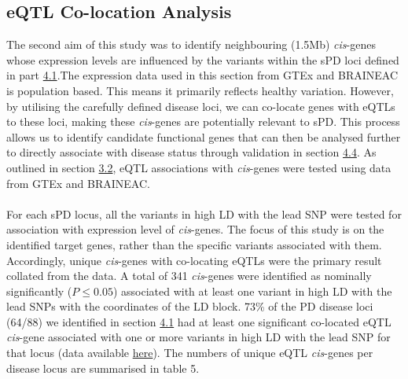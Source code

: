 \documentclass{article}
\begin{document}
\subsection{eQTL Co-location Analysis}
\label{subsec:eQTLcoloc}
The second aim of this study was to identify neighbouring (\pm1.5Mb) \textit{cis}-genes whose expression levels are influenced by the variants within the sPD loci defined in part \hyperref[subsec:blocks]{4.1}.The expression data used in this section from GTEx and BRAINEAC is population based. This means it primarily reflects healthy variation. However, by utilising the carefully defined disease loci, we can co-locate genes with eQTLs to these loci, making these \textit{cis}-genes are potentially relevant to sPD. This process allows us to identify candidate functional genes that can then be analysed further to directly associate with disease status through validation in section \hyperref[subsec:DGE]{4.4}. As outlined in section \hyperref[subsec:eQTL]{3.2}, eQTL associations with \textit{cis}-genes were tested using data from GTEx\cite{Aguet2020TheTissues} and BRAINEAC\cite{Ramasamy2014GeneticBrain}.
\\
\\For each sPD locus, all the variants in high LD with the lead SNP were tested for association with expression level of \textit{cis}-genes. The focus of this study is on the identified target genes, rather than the specific variants associated with them. Accordingly, unique \textit{cis}-genes with co-locating eQTLs were the primary result collated from the data. A total of 341 \textit{cis}-genes were identified as nominally significantly ($P \leq 0.05$) associated with at least one variant in high LD with the lead SNPs with the coordinates of the LD block. 73\% of the PD disease loci (64/88) we identified in section \hyperref[subsec:blocks]{4.1} had at least one significant co-located eQTL \textit{cis}-gene associated with one or more variants in high LD with the lead SNP for that locus (data available \href{https://github.com/Thomas-brightwell/PD-MSc-project-code/blob/main/Thesis/Supplementary%20materials/Supplementary%20Results%20table%20.csv}{here}). The numbers of unique eQTL \textit{cis}-genes per disease locus are summarised in table 5.
\end{document}
